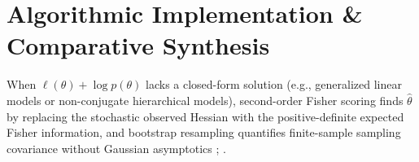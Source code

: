 \documentclass[../../../../master.tex]{subfiles}
\begin{document}
\section{Algorithmic Implementation \& Comparative Synthesis}
\label{sec:asymp:algorithms}

When $\ell(\theta) + \log p(\theta)$ lacks a closed-form solution (e.g., generalized linear models or non-conjugate hierarchical models), second-order Fisher scoring finds $\hat{\theta}$ by replacing the stochastic observed Hessian with the positive-definite expected Fisher information, and bootstrap resampling quantifies finite-sample sampling covariance without Gaussian asymptotics ; .
\end{document}

